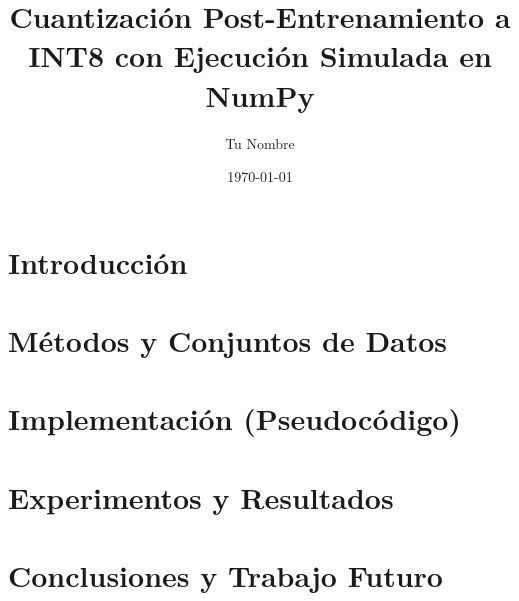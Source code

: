 \documentclass[11pt,a4paper]{article}
\title{Cuantización Post-Entrenamiento a INT8 con Ejecución Simulada en NumPy}
\author{Tu Nombre}
\date{\today}
\begin{document}
        \maketitle

        \begin{abstract}
        
        \end{abstract}

        \tableofcontents
        \listoffigures
        \listoftables

        \section{Introducción}
        

        \section{Métodos y Conjuntos de Datos}
        

        \section{Implementación (Pseudocódigo)}
        

        \section{Experimentos y Resultados}
        

        \section{Conclusiones y Trabajo Futuro}
        

        
        
        
\end{document}
